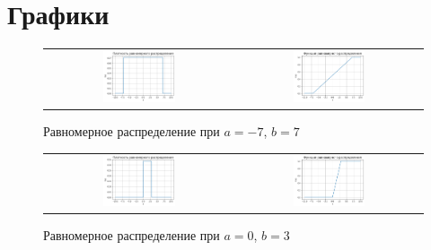 \section{Графики}

\begin{figure}[H]
    \centering
    \begin{tabular}{cc}
        \includegraphics[width=0.4\textwidth]{img/uniform/density_-7_7.png}
        &
        \includegraphics[width=0.4\textwidth]{img/uniform/function_-7_7.png}
    \end{tabular}
    \caption{Равномерное распределение при $a = -7$, $b = 7$}
    \label{fig:}
\end{figure}

\begin{figure}[H]
    \centering
    \begin{tabular}{cc}
        \includegraphics[width=0.4\textwidth]{img/uniform/density_0_3.png}
        &
        \includegraphics[width=0.4\textwidth]{img/uniform/function_0_3.png}
    \end{tabular}
    \caption{Равномерное распределение при $a = 0$, $b = 3$}
    \label{fig:}
\end{figure}

